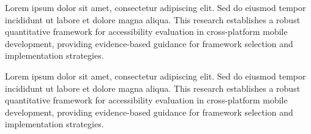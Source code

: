 \documentclass[sigconf]{acmart} %
\begin{document}
Lorem ipsum dolor sit amet, consectetur adipiscing elit. Sed do eiusmod tempor incididunt ut labore et dolore magna aliqua. This research establishes a robust quantitative framework for accessibility evaluation in cross-platform mobile development, providing evidence-based guidance for framework selection and implementation strategies.

\begin{acks}
Lorem ipsum dolor sit amet, consectetur adipiscing elit. Sed do eiusmod tempor incididunt ut labore et dolore magna aliqua. This research establishes a robust quantitative framework for accessibility evaluation in cross-platform mobile development, providing evidence-based guidance for framework selection and implementation strategies.
\end{acks}



\end{document}
